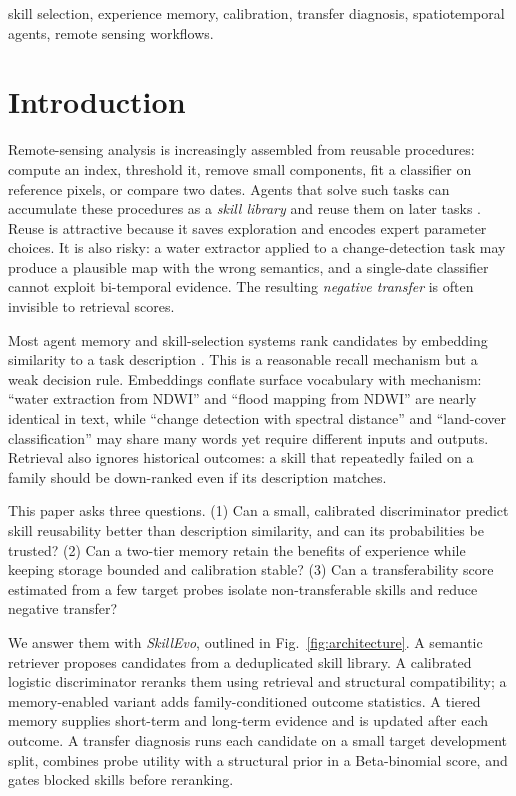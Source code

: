 \documentclass[journal]{IEEEtran}
\begin{document}
\begin{IEEEkeywords}
skill selection, experience memory, calibration, transfer diagnosis, spatiotemporal agents, remote sensing workflows.
\end{IEEEkeywords}

\section{Introduction}

Remote-sensing analysis is increasingly assembled from reusable procedures: compute an index, threshold it, remove small components, fit a classifier on reference pixels, or compare two dates. Agents that solve such tasks can accumulate these procedures as a \emph{skill library} and reuse them on later tasks \cite{voyager,expel,awm}. Reuse is attractive because it saves exploration and encodes expert parameter choices. It is also risky: a water extractor applied to a change-detection task may produce a plausible map with the wrong semantics, and a single-date classifier cannot exploit bi-temporal evidence. The resulting \emph{negative transfer} is often invisible to retrieval scores.

Most agent memory and skill-selection systems rank candidates by embedding similarity to a task description \cite{rag,voyager,memorybank}. This is a reasonable recall mechanism but a weak decision rule. Embeddings conflate surface vocabulary with mechanism: ``water extraction from NDWI'' and ``flood mapping from NDWI'' are nearly identical in text, while ``change detection with spectral distance'' and ``land-cover classification'' may share many words yet require different inputs and outputs. Retrieval also ignores historical outcomes: a skill that repeatedly failed on a family should be down-ranked even if its description matches.

This paper asks three questions. (1) Can a small, calibrated discriminator predict skill reusability better than description similarity, and can its probabilities be trusted? (2) Can a two-tier memory retain the benefits of experience while keeping storage bounded and calibration stable? (3) Can a transferability score estimated from a few target probes isolate non-transferable skills and reduce negative transfer?

We answer them with \emph{SkillEvo}, outlined in Fig.~\ref{fig:architecture}. A semantic retriever proposes candidates from a deduplicated skill library. A calibrated logistic discriminator reranks them using retrieval and structural compatibility; a memory-enabled variant adds family-conditioned outcome statistics. A tiered memory supplies short-term and long-term evidence and is updated after each outcome. A transfer diagnosis runs each candidate on a small target development split, combines probe utility with a structural prior in a Beta-binomial score, and gates blocked skills before reranking.
\end{document}
